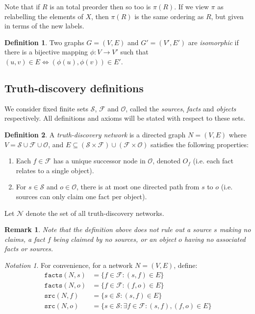 \documentclass{article}
\theoremstyle{definition} \newtheorem{definition}{Definition}
\theoremstyle{definition} \newtheorem{example}{Example}
\theoremstyle{plain} \newtheorem{axiom}{Axiom}
\theoremstyle{plain} \newtheorem*{remark}{Remark}
\theoremstyle{remark} \newtheorem*{notation}{Notation}
\theoremstyle{plain} \newtheorem{lemma}{Lemma}
\theoremstyle{plain} \newtheorem{proposition}{Proposition}
\renewcommand{\S}{\mathcal{S}}  %
\renewcommand{\O}{\mathcal{O}}  %
\newcommand{\F}{\mathcal{F}}
\newcommand{\src}{\texttt{src}}
\newcommand{\fact}{\texttt{facts}}
\begin{document}
Note that if $R$ is an total preorder then so too is $\pi(R)$. If we view $\pi$
as relabelling the elements of $X$, then $\pi(R)$ is the same ordering as $R$,
but given in terms of the new labels.

\begin{definition}

Two graphs $G=(V, E)$ and $G'=(V', E')$ are \emph{isomorphic} if there is a
bijective mapping $\phi: V \rightarrow V'$ such that $(u, v) \in E \iff
(\phi(u), \phi(v)) \in E'$.

\end{definition}

\subsection{Truth-discovery definitions}

We consider fixed finite sets $\S$, $\F$ and $\O$, called the \emph{sources},
\emph{facts} and \emph{objects} respectively. All definitions and axioms will
be stated with respect to these sets.

\begin{definition}

A \emph{truth-discovery network} is a directed graph $N = (V, E)$ where $V = \S
\cup \F \cup \O$, and $E \subseteq (\S \times \F) \cup (\F \times \O)$
satisfies the following properties:

\begin{enumerate}
\item Each $f \in \F$ has a unique successor node in $\O$, denoted $O_f$ (i.e.
each fact relates to a single object).

\item For $s \in \S$ and $o \in \O$, there is at most one directed path from
$s$ to $o$ (i.e. sources can only claim one fact per object).

\end{enumerate}
Let $\mathcal{N}$ denote the set of all truth-discovery networks.

\end{definition}

\begin{remark}
Note that the definition above does not rule out a source $s$ making no claims,
a fact $f$ being claimed by no sources, or an object $o$ having no associated
facts or sources.
\end{remark}

\begin{notation}
For convenience, for a network $N=(V, E)$, define:
\begin{align*}
    \fact(N, s) &= \{f \in \F : (s, f) \in E\} \\
    \fact(N, o) &= \{f \in \F : (f, o) \in E\} \\
    \src(N, f) &= \{s \in \S : (s, f) \in E\} \\
    \src(N, o) &= \{s \in \S : \exists f \in \F : (s, f), (f, o) \in E\} \\
\end{align*}
\end{notation}
\end{document}
